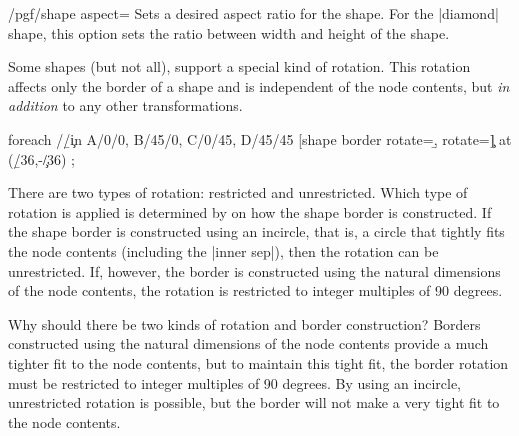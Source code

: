 \begin{key}{/pgf/shape aspect=}
    Sets a desired aspect ratio for the shape. For the |diamond| shape, this
    option sets the ratio between width and height of the shape.
\begin{codeexample}[preamble={\usetikzlibrary{shapes.geometric}}]
\end{codeexample}
\end{key}

    \label{section-rotating-shape-borders}

Some shapes (but not all), support a special kind of rotation. This rotation
affects only the border of a shape and is independent of the node contents, but
\emph{in addition} to any other transformations.
%
\begin{codeexample}[preamble={\usetikzlibrary{shapes.geometric}}]
\tikz \node foreach \a/\b/\c in {A/0/0, B/45/0, C/0/45, D/45/45}
            [shape border rotate=\b, rotate=\c] at (\b/36,-\c/36) {\a};
\end{codeexample}

There are two types of rotation: restricted and unrestricted. Which type of
rotation is applied is determined by on how the shape border is constructed. If
the shape border is constructed using an incircle, that is, a circle that
tightly fits the node contents (including the |inner sep|), then the rotation
can be unrestricted. If, however, the border is constructed using the natural
dimensions of the node contents, the rotation is restricted to integer
multiples of 90 degrees.

Why should there be two kinds of rotation and border construction? Borders
constructed using the natural dimensions of the node contents provide a much
tighter fit to the node contents, but to maintain this tight fit, the border
rotation must be restricted to integer multiples of 90 degrees. By using an
incircle, unrestricted rotation is possible, but the border will not make a
very tight fit to the node contents.
%
\begin{codeexample}[preamble={\usetikzlibrary{shapes.geometric}}]
\end{codeexample}

